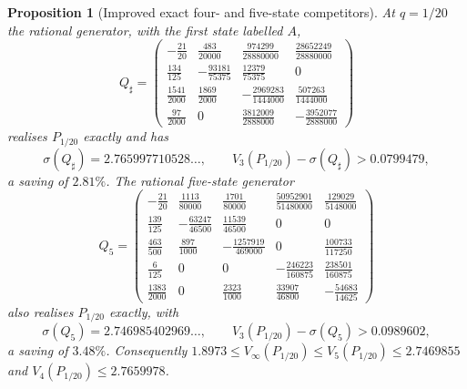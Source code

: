 \documentclass[11pt,a4paper]{article}
\newtheorem{proposition}[theorem]{Proposition}
\theoremstyle{remark}\newtheorem{remark}[theorem]{Remark}
\begin{document}
\begin{proposition}[Improved exact four- and five-state competitors]\label{prop:improved}
At $q=1/20$ the rational generator, with the first state labelled $A$,
\begin{equation}\label{eq:improved}
 Q_\sharp=
 \begin{pmatrix}
 -\frac{21}{20}&\frac{483}{20000}&\frac{974299}{28880000}&\frac{28652249}{28880000}\\[2pt]
 \frac{134}{125}&-\frac{93181}{75375}&\frac{12379}{75375}&0\\[2pt]
 \frac{1541}{2000}&\frac{1869}{2000}&-\frac{2969283}{1444000}&\frac{507263}{1444000}\\[2pt]
 \frac{97}{2000}&0&\frac{3812009}{2888000}&-\frac{3952077}{2888000}
 \end{pmatrix}
\end{equation}
realises $P_{1/20}$ exactly and has
\begin{equation}
 \sigma(Q_\sharp)=2.765997710528\ldots,\qquad
 V_3(P_{1/20})-\sigma(Q_\sharp)>0.0799479,
\end{equation}
a saving of $2.81\%$. The rational five-state generator
\begin{equation}\label{eq:five}
 Q_5=
 \begin{pmatrix}
 -\frac{21}{20}&\frac{1113}{80000}&\frac{1701}{80000}&\frac{50952901}{51480000}&\frac{129029}{5148000}\\[2pt]
 \frac{139}{125}&-\frac{63247}{46500}&\frac{11539}{46500}&0&0\\[2pt]
 \frac{463}{500}&\frac{897}{1000}&-\frac{1257919}{469000}&0&\frac{100733}{117250}\\[2pt]
 \frac{6}{125}&0&0&-\frac{246223}{160875}&\frac{238501}{160875}\\[2pt]
 \frac{1383}{2000}&0&\frac{2323}{1000}&\frac{33907}{46800}&-\frac{54683}{14625}
 \end{pmatrix}
\end{equation}
also realises $P_{1/20}$ exactly, with
\begin{equation}
 \sigma(Q_5)=2.746985402969\ldots,\qquad
 V_3(P_{1/20})-\sigma(Q_5)>0.0989602,
\end{equation}
a saving of $3.48\%$. Consequently
$1.8973\leq V_\infty(P_{1/20})\leq V_5(P_{1/20})\leq2.7469855$ and
$V_4(P_{1/20})\leq2.7659978$.
\end{proposition}
\end{document}
